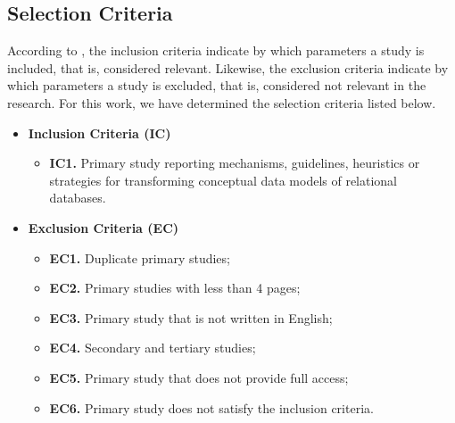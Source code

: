 \subsection{Selection Criteria} \label{ssec_slm:selectionCriteria}

According to \cite{Kitchenham:2007}, the inclusion criteria indicate by which parameters a study is included, that is, considered relevant.
Likewise, the exclusion criteria indicate by which parameters a study is excluded, that is, considered not relevant in the research.
For this work, we have determined the selection criteria listed below.

\begin{itemize}
    \item \textbf{Inclusion Criteria (IC)}    
    \begin{itemize}
        \item \textbf{IC1.} Primary study reporting mechanisms, guidelines, heuristics or strategies for transforming conceptual data models of relational databases. 
    \end{itemize}
    \item \textbf{Exclusion Criteria (EC)}
    \begin{itemize}
        \item \textbf{EC1.} Duplicate primary studies;
        \item \textbf{EC2.} Primary studies with less than 4 pages;
        \item \textbf{EC3.} Primary study that is not written in English;
        \item \textbf{EC4.} Secondary and tertiary studies;
        \item \textbf{EC5.} Primary study that does not provide full access;
        \item \textbf{EC6.} Primary study does not satisfy the inclusion criteria.
    \end{itemize}
\end{itemize}

